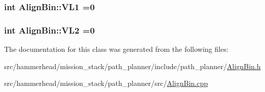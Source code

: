 \subsubsection[{\texorpdfstring{V\+L1}{VL1}}]{\setlength{\rightskip}{0pt plus 5cm}int Align\+Bin\+::\+V\+L1 =0}\hypertarget{classAlignBin_acb43ad409fe61135fe1eba9c0347f3e9}{}\label{classAlignBin_acb43ad409fe61135fe1eba9c0347f3e9}
\subsubsection[{\texorpdfstring{V\+L2}{VL2}}]{\setlength{\rightskip}{0pt plus 5cm}int Align\+Bin\+::\+V\+L2 =0}\hypertarget{classAlignBin_a0a7000cecbb77704fb06e3d8112e131e}{}\label{classAlignBin_a0a7000cecbb77704fb06e3d8112e131e}


The documentation for this class was generated from the following files\+:\begin{DoxyCompactItemize}
\item 
src/hammerhead/mission\+\_\+stack/path\+\_\+planner/include/path\+\_\+planner/\hyperlink{AlignBin_8h}{Align\+Bin.\+h}\item 
src/hammerhead/mission\+\_\+stack/path\+\_\+planner/src/\hyperlink{AlignBin_8cpp}{Align\+Bin.\+cpp}\end{DoxyCompactItemize}
